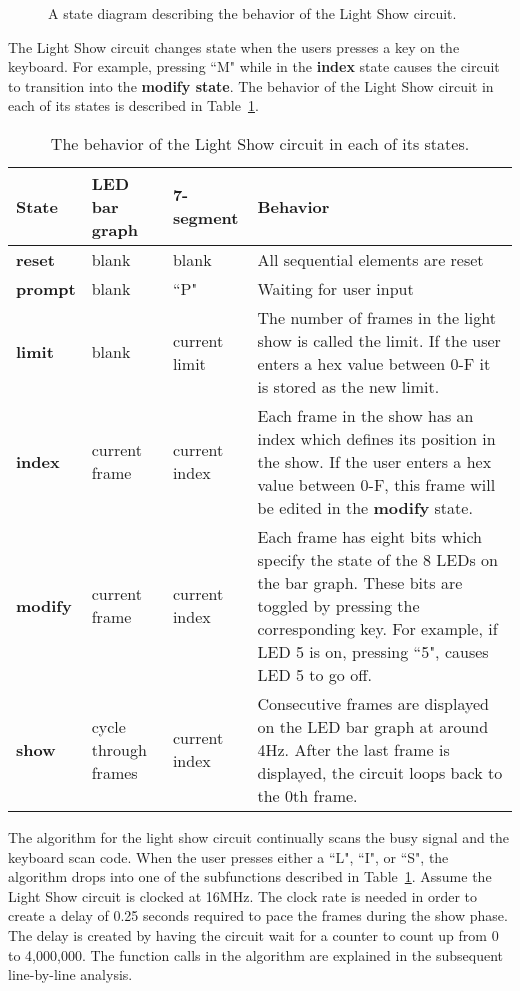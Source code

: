 \begin{figure}[ht]
\caption{A state diagram describing the behavior of the Light Show circuit.}
\label{fig:datapathControlLSbehavior}
\end{figure}

The Light Show circuit changes state when the users presses a key on 
the keyboard. For example, pressing ``M" while in the \textbf{ index } state causes 
the circuit to transition into the \textbf{ modify state}. The behavior of the 
Light Show circuit in each of its states is described in 
Table~\ref{table:LSbehavior}.

\begin{table}
\begin{tabular}{l|l|l|p{2.0in}}
\textbf{ State }	& LED bar graph	& 7-segment	& Behavior 				\\ \hline \hline
\textbf{ reset }	& blank		& blank		& All sequential elements are reset 	\\ \hline
\textbf{ prompt }	& blank		& ``P"		& Waiting for user input		\\ \hline
\textbf{ limit }	& blank		& current limit	& The number of frames in the light show is called 
	the limit. If the user enters a hex value between 0-F it is stored as the new limit. \\  \hline
\textbf{ index }	& current frame	& current index	& Each frame in the show has an index which defines 
	its position in the show. If the user enters a hex value between 0-F, this frame will 
	be edited in the \textbf{ modify } state. 						\\ \hline
\textbf{ modify }	& current frame	& current index	& Each frame has eight bits which specify the state of 
	the 8 LEDs on the bar graph.  These bits are toggled by pressing the corresponding 
	key. For example, if LED 5 is on, pressing ``5", causes LED 5 
	to go off.								\\ \hline
\textbf{ show }	& cycle through frames & current index & Consecutive frames are displayed on the 
	LED bar graph at around 4Hz. After the last frame is displayed, the circuit loops 
	back to the 0th frame. 							\\ 
\end{tabular}
\caption{The behavior of the Light Show circuit in each of its states.}
\label{table:LSbehavior}
\end{table}

The algorithm for the light show circuit continually scans the busy signal 
and the keyboard scan code.  When the user presses either a ``L", 
``I", or ``S", 
the algorithm drops into one of the subfunctions described in 
Table~\ref{table:LSbehavior}.  Assume the Light Show circuit is
clocked at 16MHz.  The clock rate is needed in order to create a delay of
0.25 seconds required to pace the frames during the show phase.  The delay is
created by having the circuit wait for a counter to count up from 0 to 
4,000,000.  The function calls in the algorithm are explained in the 
subsequent line-by-line analysis.

